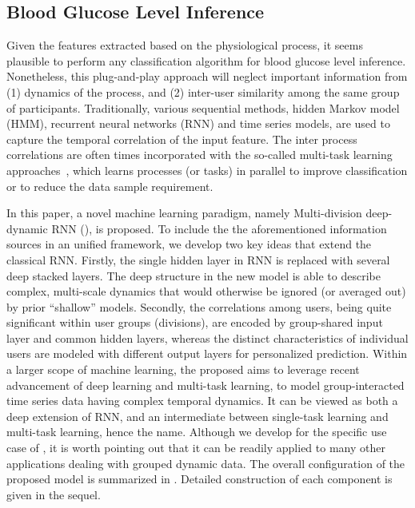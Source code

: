 \subsection{Blood Glucose Level Inference}
Given the features extracted based on the physiological process, it seems plausible to perform any classification algorithm for blood glucose level inference.
Nonetheless, this plug-and-play approach will neglect important information from (1) dynamics of the process, and (2) inter-user similarity among the same group of participants.
Traditionally, various sequential methods, \eg hidden Markov model (HMM), recurrent neural networks (RNN) and time series models, are used to capture the temporal correlation of the input feature.
The inter process correlations are often times incorporated with the so-called multi-task learning approaches~\cite{evgeniou2004regularized}, which learns processes (or tasks) in parallel to improve classification or to reduce the data sample requirement.

In this paper, a novel machine learning paradigm, namely Multi-division deep-dynamic RNN (\modelname), is proposed.
To include the the aforementioned information sources in an unified framework, we develop two key ideas that extend the classical RNN. Firstly, the single hidden layer in RNN is replaced with several deep stacked layers.
The deep structure in the new model is able to describe complex, multi-scale dynamics that would otherwise be ignored (or averaged out) by prior ``shallow'' models.
Secondly, the correlations among users, being quite significant within user groups (divisions), are encoded by group-shared input layer and common hidden layers, whereas the distinct characteristics of individual users are modeled with different output layers for personalized prediction.
Within a larger scope of machine learning, the proposed \modelname aims to leverage recent advancement of deep learning and multi-task learning, to model group-interacted time series data having complex temporal dynamics.
It can be viewed as both a deep extension of RNN, and an intermediate between single-task learning and multi-task learning, hence the name.
Although we develop \modelname for the specific use case of \sysname, it is worth pointing out that it can be readily applied to many other applications dealing with grouped dynamic data.
The overall configuration of the proposed model is summarized in .
Detailed construction of each component is given in the sequel.

